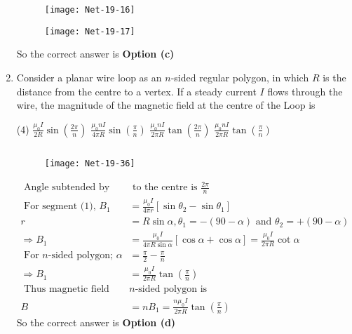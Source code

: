 \begin{enumerate}
\begin{tasks}
\begin{figure}[H]
		\centering
		\texttt{[image: Net-19-16]}
	\end{figure}
	\task[\textbf{d.}] 
		\begin{figure}[H]
		\centering
		\texttt{[image: Net-19-17]}
	\end{figure}
\end{tasks}
\begin{answer}
	So the correct answer is \textbf{Option (c)}
\end{answer}
\item  Consider a planar wire loop as an $n$-sided regular polygon, in which $R$ is the distance from the centre to a vertex. If a steady current $I$ flows through the wire, the magnitude of the magnetic field at the centre of the Loop is
 \begin{tasks}(4)
	\task[\textbf{a.}]$\frac{\mu_{0} I}{2 R} \sin \left(\frac{2 \pi}{n}\right)$
	\task[\textbf{b.}] $\frac{\mu_{0} n I}{4 \pi R} \sin \left(\frac{\pi}{n}\right)$
	\task[\textbf{c.}]$\frac{\mu_{0} n I}{2 \pi R} \tan \left(\frac{2 \pi}{n}\right)$
	\task[\textbf{d.}] $\frac{\mu_{0} n I}{2 \pi R} \tan \left(\frac{\pi}{n}\right)$
\end{tasks}
\begin{answer}$\left. \right. $
	\begin{figure}[H]
		\centering
		\texttt{[image: Net-19-36]}
	\end{figure}
	\begin{align*}
	\text { Angle subtended by one side}&\text{ to the centre is } \frac{2 \pi}{n}\\
	\text { For segment (1), } B_{1}&=\frac{\mu_{0} I}{4 \pi r}\left[\sin \theta_{2}-\sin \theta_{1}\right]\\
	r&=R \sin \alpha, \theta_{1}=-(90-\alpha) \text { and } \theta_{2}=+(90-\alpha) \\
	\Rightarrow B_{1}&=\frac{\mu_{0} I}{4 \pi R \sin \alpha}[\cos \alpha+\cos \alpha]=\frac{\mu_{0} I}{2 \pi R} \cot \alpha\\
	\text { For } n \text {-sided polygon; } \alpha&=\frac{\pi}{2}-\frac{\pi}{n}\\
	\Rightarrow B_{1}&=\frac{\mu_{0} I}{2 \pi R} \tan \left(\frac{\pi}{n}\right)\\
\text{	Thus magnetic field due to }&\text{$n$-sided polygon is}\\
	B&=n B_{1}=\frac{n \mu_{0} I}{2 \pi R} \tan \left(\frac{\pi}{n}\right)
	\end{align*}
	So the correct answer is \textbf{Option (d)}

\end{answer}
\end{enumerate}

